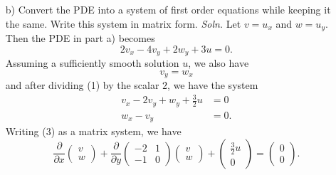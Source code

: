 \documentclass{article}
\begin{document}
\begin{itemize}
\begin{itemize}
        \item[b)] Convert the PDE into a system of first order equations while keeping it the same. Write this system in matrix form. 
        \newline\newline
        \textit{Soln.} Let $v = u_x$ and $w = u_y$. Then the PDE in part a) becomes
        \begin{equation}
            2v_x - 4v_y + 2w_y + 3u = 0.
        \end{equation}
        Assuming a sufficiently smooth solution $u$, we also have
        \begin{equation}
            v_y = w_x
        \end{equation}
        and after dividing (1) by the scalar $2$, we have the system
        \begin{equation}
            \begin{aligned}
                v_x - 2v_y + w_y + \frac{3}{2}u &= 0\\
                w_x - v_y &= 0.
            \end{aligned}
        \end{equation}
        Writing (3) as a matrix system, we have
        \[\frac{\partial }{\partial x}\begin{pmatrix}
            v\\
            w
        \end{pmatrix} + \frac{\partial}{\partial y}\begin{pmatrix}
            -2 & 1\\
            -1 & 0
        \end{pmatrix}\begin{pmatrix}
            v\\
            w
        \end{pmatrix} + \begin{pmatrix}
            \tfrac{3}{2}u\\
            0
        \end{pmatrix} = \begin{pmatrix}
            0\\
            0
        \end{pmatrix}.\]
        \vspace{0.5cm}
        

\end{itemize}
\end{itemize}
\end{document}
